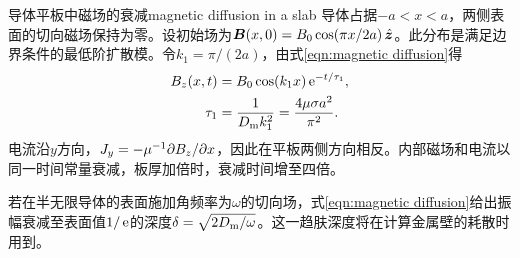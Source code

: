 \begin{example}{导体平板中磁场的衰减}{magnetic diffusion in a slab}
    导体占据$-a < x < a$，两侧表面的切向磁场保持为零。设初始场为$\bm B(x,0) = B_0\cos(\pi x/2a)\mathop{}\!\hat{\bm{z}}$。此分布是满足边界条件的最低阶扩散模。令$k_1 = \pi/(2a)$，由式\eqref{eqn:magnetic diffusion}得
    \begin{subequations}
        \label{eq:ed-slab-diffusion-time}
        \begin{align}
            B_z(x,t) &= B_0\cos(k_1x)\mathop{}\!\mathrm{e}^{-t/\tau_1},\\
            \tau_1 &= \frac1{D_\mathrm m k_1^2} = \frac{4\mu\sigma a^2}{\pi^2}.
        \end{align}
    \end{subequations}
    电流沿$y$方向，$J_y = -\mu^{-1}\partial B_z/\partial x$，因此在平板两侧方向相反。内部磁场和电流以同一时间常量衰减，板厚加倍时，衰减时间增至四倍。
\end{example}

若在半无限导体的表面施加角频率为$\omega$的切向场，式\eqref{eqn:magnetic diffusion}给出振幅衰减至表面值$1/\mathop{}\!\mathrm{e}$的深度$\delta = \sqrt{2D_\mathrm m/\omega}$。这一趋肤深度将在计算金属壁的耗散时用到。

